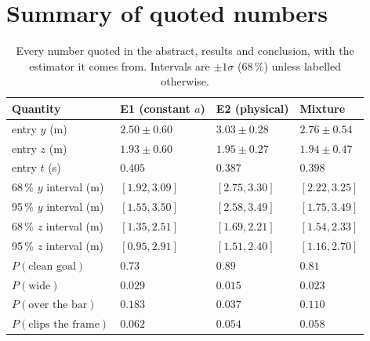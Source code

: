 

\section{Summary of quoted numbers}
\label{app:numbers}

\begin{table}[htbp]
  \centering
  \small
  \caption{Every number quoted in the abstract, results and conclusion, with
  the estimator it comes from. Intervals are $\pm1\sigma$ (68\,\%) unless
  labelled otherwise.}
  \label{tab:allnumbers}
  \begin{tabular}{@{}llll@{}}
    \toprule
    Quantity & E1 (constant $a$) & E2 (physical) & Mixture \\
    \midrule
    entry $y$ (m)            & $2.50\pm0.60$ & $3.03\pm0.28$ & $2.76\pm0.54$ \\
    entry $z$ (m)            & $1.93\pm0.60$ & $1.95\pm0.27$ & $1.94\pm0.47$ \\
    entry $t$ (s)            & $0.405$       & $0.387$       & $0.398$ \\
    68\,\% $y$ interval (m)  & $[1.92,3.09]$ & $[2.75,3.30]$ & $[2.22,3.25]$ \\
    95\,\% $y$ interval (m)  & $[1.55,3.50]$ & $[2.58,3.49]$ & $[1.75,3.49]$ \\
    68\,\% $z$ interval (m)  & $[1.35,2.51]$ & $[1.69,2.21]$ & $[1.54,2.33]$ \\
    95\,\% $z$ interval (m)  & $[0.95,2.91]$ & $[1.51,2.40]$ & $[1.16,2.70]$ \\
    $P(\text{clean goal})$   & $0.73$        & $0.89$        & $0.81$ \\
    $P(\text{wide})$         & $0.029$       & $0.015$       & $0.023$ \\
    $P(\text{over the bar})$ & $0.183$       & $0.037$       & $0.110$ \\
    $P(\text{clips the frame})$ & $0.062$   & $0.054$       & $0.058$ \\
    \bottomrule
  \end{tabular}
\end{table}
